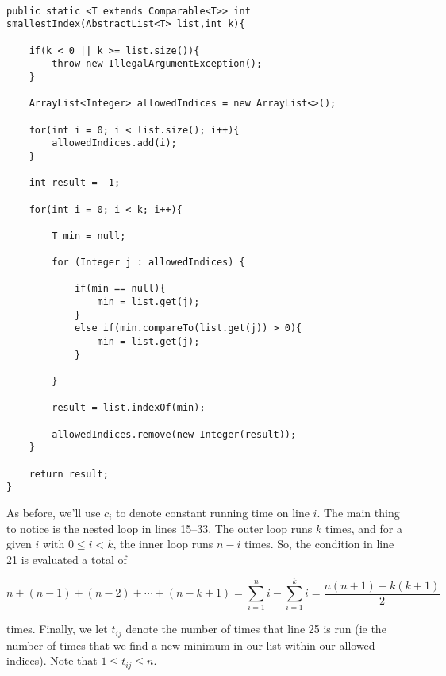 \documentclass{article}
\begin{document}
\begin{verbatim}

public static <T extends Comparable<T>> int smallestIndex(AbstractList<T> list,int k){
		
	if(k < 0 || k >= list.size()){
		throw new IllegalArgumentException();
	}
		
	ArrayList<Integer> allowedIndices = new ArrayList<>();
	
	for(int i = 0; i < list.size(); i++){
		allowedIndices.add(i);
	}
	
	int result = -1;
	
	for(int i = 0; i < k; i++){
		
		T min = null;
		
		for (Integer j : allowedIndices) {
			
			if(min == null){
				min = list.get(j);
			}
			else if(min.compareTo(list.get(j)) > 0){
				min = list.get(j);
			}
			
		}
		
		result = list.indexOf(min);
		
		allowedIndices.remove(new Integer(result));
	}
	
	return result;
}

\end{verbatim}

\bigskip

As before, we'll use $c_i$ to denote constant running time on line $i$. The main thing to notice is the nested loop in lines 15--33. The outer loop runs $k$ times, and for a given $i$ with $0\leq i < k$, the inner loop runs $n-i$ times. So, the condition in line 21 is evaluated a total of 

\[
	n + (n-1) + (n-2) + \cdots + (n-k+1) = \sum\limits_{i=1}^n i - \sum\limits_{i=1}^k i = \frac{n(n+1) - k(k+1)}{2}
\]

\noindent times. Finally, we let $t_{ij}$ denote the number of times that line 25 is run (ie the number of times that we find a new minimum in our list within our allowed indices). Note that $1 \leq t_{ij} \leq n$.

\bigskip
\end{document}
